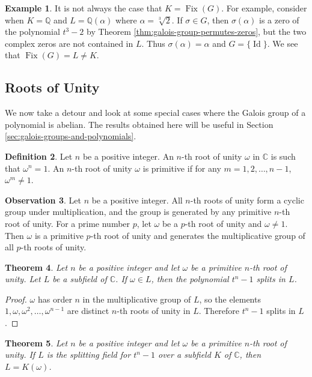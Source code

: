 \documentclass[12pt]{article}
\newtheorem{theorem}{Theorem}
\theoremstyle{definition}
\newtheorem{definition}[theorem]{Definition}
\newtheorem{example}[theorem]{Example}
\newtheorem{observation}[theorem]{\textbf{Observation}}
\newcommand{\Fix}{\operatorname{Fix}}
\newcommand{\Id}{\operatorname{Id}}
\newcommand{\Q}{\mathbb Q}
\begin{document}
\begin{example}
    It is not always the case that $K = \Fix(G)$. For example, consider when $K = \Q$ and $L = \Q (\alpha)$ where $\alpha = \sqrt[3]{2}$. If $\sigma \in G$, then $\sigma(\alpha)$ is a zero of the polynomial $t^3 - 2$ by Theorem \ref{thm:galois-group-permutes-zeros}, but the two complex zeros are not contained in $L$. Thus $\sigma(\alpha) = \alpha$ and $G = \{ \Id \}$. We see that $\Fix(G) = L \neq K$. 
\end{example}

\subsection{Roots of Unity}
We now take a detour and look at some special cases where the Galois group of a polynomial is abelian. The results obtained here will be useful in Section \ref{sec:galois-groups-and-polynomials}. 

\begin{definition}
	Let $n$ be a positive integer. An $n$-th root of unity $\omega$ in $\mathbb C$ is such that $\omega ^ n = 1$. An $n$-th root of unity $\omega$ is primitive if for any $m = 1, 2, \dots, n - 1$, $\omega ^ m \neq 1$.
\end{definition}

\begin{observation}
	Let $n$ be a positive integer. All $n$-th roots of unity form a cyclic group under multiplication, and the group is generated by any primitive $n$-th root of unity. For a prime number $p$, let $\omega$ be a $p$-th root of unity and $\omega \neq 1$. Then $\omega$ is a primitive $p$-th root of unity and generates the multiplicative group of all $p$-th roots of unity.
\end{observation}

\begin{theorem} \label{thm:unity-1}
	Let $n$ be a positive integer and let $\omega$ be a primitive $n$-th root of unity. Let $L$ be a subfield of $\mathbb C$. If $\omega \in L$, then the polynomial $t^n - 1$ splits in $L$.
\end{theorem}
\begin{proof}
	$\omega$ has order $n$ in the multiplicative group of $L$, so the elements $1, \omega, \omega^2, \ldots, \omega^{n-1}$ are distinct $n$-th roots of unity in $L$. Therefore $t^n-1$ splits in $L$.
\end{proof}

\begin{theorem} \label{thm:unity-2}
	Let $n$ be a positive integer and let $\omega$ be a primitive $n$-th root of unity. If $L$ is the splitting field for $t^n - 1$ over a subfield $K$ of $\mathbb C$, then $L = K(\omega)$.
\end{theorem}
\end{document}

